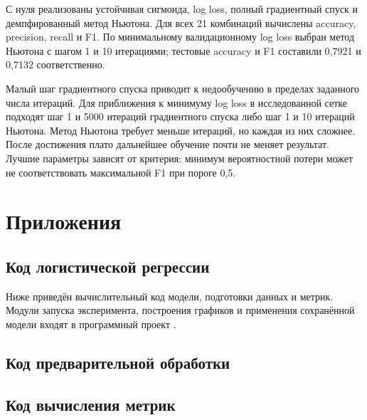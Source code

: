 С нуля реализованы устойчивая сигмоида, log loss, полный градиентный спуск и демпфированный метод Ньютона. Для всех 21 комбинаций вычислены accuracy, precision, recall и F1. По минимальному валидационному log loss выбран метод Ньютона с шагом 1 и 10 итерациями; тестовые accuracy и F1 составили 0,7921 и 0,7132 соответственно.

Малый шаг градиентного спуска приводит к недообучению в пределах заданного числа итераций. Для приближения к минимуму log loss в исследованной сетке подходят шаг 1 и 5000 итераций градиентного спуска либо шаг 1 и 10 итераций Ньютона. Метод Ньютона требует меньше итераций, но каждая из них сложнее. После достижения плато дальнейшее обучение почти не меняет результат. Лучшие параметры зависят от критерия: минимум вероятностной потери может не соответствовать максимальной F1 при пороге 0,5.


\newpage
\section{Приложения}
\subsection{Код логистической регрессии}
Ниже приведён вычислительный код модели, подготовки данных и метрик. Модули запуска эксперимента, построения графиков и применения сохранённой модели входят в программный проект .

\subsection{Код предварительной обработки}

\subsection{Код вычисления метрик}

